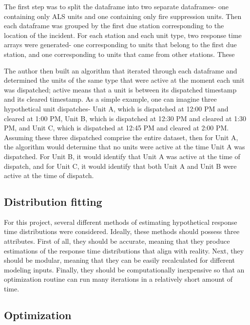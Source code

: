 \documentclass[article]{proc}
\begin{document}
The first step was to split the dataframe into two separate dataframes- one containing only ALS units and one containing only fire suppression units. Then each dataframe was grouped by the first due station corresponding to the location of the incident. For each station and each unit type, two response time arrays were generated- one corresponding to units that belong to the first due station, and one corresponding to units that came from other stations. These 



The author then built an algorithm that iterated through each dataframe and determined the units of the same type that were active at the moment each unit was dispatched; active means that a unit is between its dispatched timestamp and its cleared timestamp.
As a simple example, one can imagine three hypothetical unit dispatches- Unit A, which is dispatched at 12:00 PM and cleared at 1:00 PM, Unit B, which is dispatched at 12:30 PM and cleared at 1:30 PM, and Unit C, which is dispatched at 12:45 PM and cleared at 2:00 PM. Assuming these three dispatched comprise the entire dataset, then for Unit A, the algorithm would determine that no units were active at the time Unit A was dispatched. For Unit B, it would identify that Unit A was active at the time of dispatch, and for Unit C, it would identify that both Unit A and Unit B were active at the time of dispatch. 







\subsection{Distribution fitting}
For this project, several different methods of estimating hypothetical response time distributions were considered. Ideally, these methods should possess three attributes. First of all, they should be accurate, meaning that they produce estimations of the response time distributions that align with reality. Next, they should be modular, meaning that they can be easily recalculated for different modeling inputs. Finally, they should be computationally inexpensive so that an optimization routine can run many iterations in a relatively short amount of time. 


\subsection{Optimization}
\end{document}

